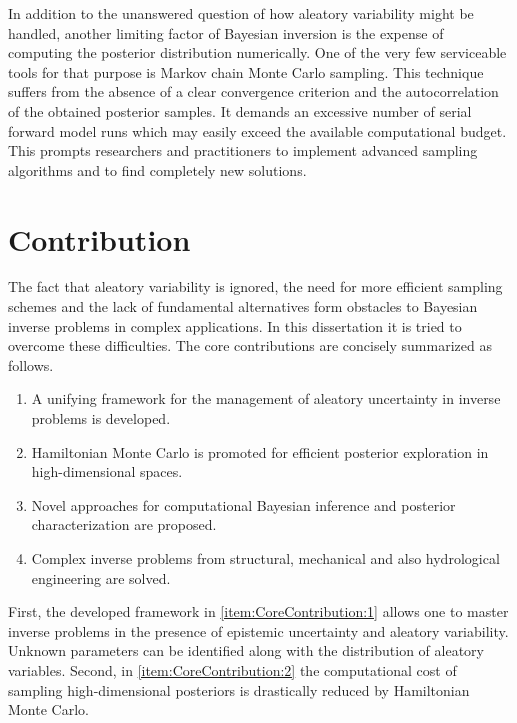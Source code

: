 \begin{refsection}
\par %
In addition to the unanswered question of how aleatory variability might be handled,
another limiting factor of Bayesian inversion is the expense of computing the posterior distribution numerically.
One of the very few serviceable tools for that purpose is Markov chain Monte Carlo sampling.
This technique suffers from the absence of a clear convergence criterion and the autocorrelation of the obtained posterior samples.
It demands an excessive number of serial forward model runs which may easily exceed the available computational budget.
This prompts researchers and practitioners to implement advanced sampling algorithms and to find completely new solutions.

\section{Contribution}
The fact that aleatory variability is ignored, the need for more efficient sampling schemes and the lack of fundamental alternatives
form obstacles to Bayesian inverse problems in complex applications.
In this dissertation it is tried to overcome these difficulties.
The core contributions are concisely summarized as follows.
\begin{enumerate}[label=\arabic*)]
  \item \label{item:CoreContribution:1} A unifying framework for the management of aleatory uncertainty in inverse problems is developed.
  \item \label{item:CoreContribution:2} Hamiltonian Monte Carlo is promoted for efficient posterior exploration in high-dimensional spaces.
  \item \label{item:CoreContribution:3} Novel approaches for computational Bayesian inference and posterior characterization are proposed.
  \item \label{item:CoreContribution:4} Complex inverse problems from structural, mechanical and also hydrological engineering are solved.
\end{enumerate}
\par %
First, the developed framework in \ref{item:CoreContribution:1} allows one to master inverse problems in the presence of epistemic uncertainty and aleatory variability.
Unknown parameters can be identified along with the distribution of aleatory variables.
Second, in \ref{item:CoreContribution:2} the computational cost of sampling high-dimensional posteriors is drastically reduced by Hamiltonian Monte Carlo.

\end{refsection}
